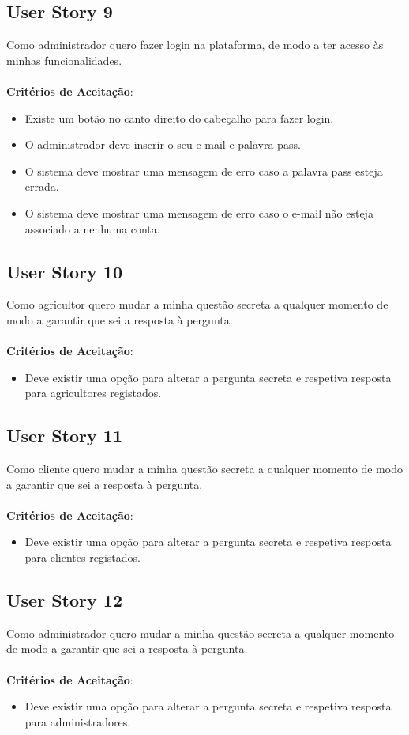 \documentclass[a4paper,11pt]{article}
\begin{document}
\subsection{User Story 9}
Como administrador quero fazer login na plataforma, de modo a ter acesso às minhas funcionalidades.\\\\
\textbf{Critérios de Aceitação}:
\begin{itemize}
  \item Existe um botão no canto direito do cabeçalho para fazer login.
  \item O administrador deve inserir o seu e-mail e palavra pass.
  \item O sistema deve mostrar uma mensagem de erro caso a palavra pass esteja errada.
  \item O sistema deve mostrar uma mensagem de erro caso o e-mail não esteja associado a nenhuma conta.
\end{itemize}
\subsection{User Story 10}
Como agricultor quero mudar a minha questão secreta a qualquer momento de modo a garantir que sei a resposta à pergunta.\\\\
\textbf{Critérios de Aceitação}:
\begin{itemize}
  \item Deve existir uma opção para alterar a pergunta secreta e respetiva resposta para agricultores registados.
\end{itemize}
\subsection{User Story 11}
Como cliente quero mudar a minha questão secreta a qualquer momento de modo a garantir que sei a resposta à pergunta.\\\\
\textbf{Critérios de Aceitação}:
\begin{itemize}
  \item Deve existir uma opção para alterar a pergunta secreta e respetiva resposta para clientes registados.
\end{itemize}
\subsection{User Story 12}
Como administrador quero mudar a minha questão secreta a qualquer momento de modo a garantir que sei a resposta à pergunta.\\\\
\textbf{Critérios de Aceitação}:
\begin{itemize}
  \item Deve existir uma opção para alterar a pergunta secreta e respetiva resposta para administradores.
\end{itemize}
\end{document}
